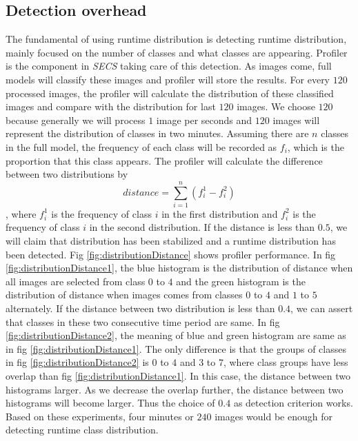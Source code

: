 \documentclass[pageno]{jpaper}
\begin{document}
\subsection{Detection overhead}
The fundamental of using runtime distribution is detecting runtime distribution, mainly focused on the number of classes and what classes are appearing. Profiler is the component in \textit{SECS} taking care of this detection. As images come, full models will classify these images and profiler will store the results. For every $120$ processed images, the profiler will calculate the distribution of these classified images and compare with the distribution for last $120$ images. We choose $120$ because generally we will process $1$ image per seconds and $120$ images will represent the distribution of classes in two minutes. Assuming there are $n$ classes in the full model, the frequency of each class will be recorded as $f_i$, which is the proportion that this class appears. The profiler will calculate the difference between two distributions by 
\begin{equation}
    distance = \sum_{i = 1}^{n}(f_i^1 - f_i^2)
\end{equation}
, where $f_i^1$ is the frequency of class $i$ in the first distribution and $f_i^2$ is the frequency of class $i$ in the second distribution. If the distance is less than $0.5$, we will claim that distribution has been stabilized and a runtime distribution has been detected. Fig \ref{fig:distributionDistance} shows profiler performance. In fig \ref{fig:distributionDistance1}, the blue histogram is the distribution of distance when all images are selected from class $0$ to $4$ and the green histogram is the distribution of distance when images comes from classes $0$ to $4$ and $1$ to $5$ alternately. If the distance between two distribution is less than $0.4$, we can assert that classes in these two consecutive time period are same. In fig \ref{fig:distributionDistance2}, the meaning of blue and green histogram are same as in fig \ref{fig:distributionDistance1}. The only difference is that the groups of classes in fig \ref{fig:distributionDistance2} is $0$ to $4$ and $3$ to $7$, where class groups have less overlap than fig \ref{fig:distributionDistance1}. In this case, the distance between two histograms larger. As we decrease the overlap further, the distance between two histograms will become larger. Thus the choice of $0.4$ as detection criterion works. Based on these experiments, four minutes or $240$ images would be enough for detecting runtime class distribution.
\end{document}
